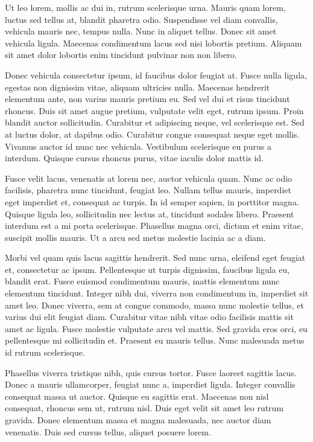 \documentclass[2pt,a4paper,twoside ]{article}
\begin{document}
\begin{multicols}{2}
Ut leo lorem, mollis ac dui in, rutrum scelerisque urna. Mauris quam lorem, luctus sed tellus at, blandit pharetra odio. Suspendisse vel diam convallis, vehicula mauris nec, tempus nulla. Nunc in aliquet tellus. Donec sit amet vehicula ligula. Maecenas condimentum lacus sed nisi lobortis pretium. Aliquam sit amet dolor lobortis enim tincidunt pulvinar non non libero.

Donec vehicula consectetur ipsum, id faucibus dolor feugiat at. Fusce nulla ligula, egestas non dignissim vitae, aliquam ultricies nulla. Maecenas hendrerit elementum ante, non varius mauris pretium eu. Sed vel dui et risus tincidunt rhoncus. Duis sit amet augue pretium, vulputate velit eget, rutrum ipsum. Proin blandit auctor sollicitudin. Curabitur et adipiscing neque, vel scelerisque est. Sed at luctus dolor, at dapibus odio. Curabitur congue consequat neque eget mollis. Vivamus auctor id nunc nec vehicula. Vestibulum scelerisque eu purus a interdum. Quisque cursus rhoncus purus, vitae iaculis dolor mattis id.

Fusce velit lacus, venenatis at lorem nec, auctor vehicula quam. Nunc ac odio facilisis, pharetra nunc tincidunt, feugiat leo. Nullam tellus mauris, imperdiet eget imperdiet et, consequat ac turpis. In id semper sapien, in porttitor magna. Quisque ligula leo, sollicitudin nec lectus at, tincidunt sodales libero. Praesent interdum est a mi porta scelerisque. Phasellus magna orci, dictum et enim vitae, suscipit mollis mauris. Ut a arcu sed metus molestie lacinia ac a diam.

Morbi vel quam quis lacus sagittis hendrerit. Sed nunc urna, eleifend eget feugiat et, consectetur ac ipsum. Pellentesque ut turpis dignissim, faucibus ligula eu, blandit erat. Fusce euismod condimentum mauris, mattis elementum nunc elementum tincidunt. Integer nibh dui, viverra non condimentum in, imperdiet sit amet leo. Donec viverra, sem at congue commodo, massa nunc molestie tellus, et varius dui elit feugiat diam. Curabitur vitae nibh vitae odio facilisis mattis sit amet ac ligula. Fusce molestie vulputate arcu vel mattis. Sed gravida eros orci, eu pellentesque mi sollicitudin et. Praesent eu mauris tellus. Nunc malesuada metus id rutrum scelerisque.

Phasellus viverra tristique nibh, quis cursus tortor. Fusce laoreet sagittis lacus. Donec a mauris ullamcorper, feugiat nunc a, imperdiet ligula. Integer convallis consequat massa ut auctor. Quisque eu sagittis erat. Maecenas non nisl consequat, rhoncus sem ut, rutrum nisl. Duis eget velit sit amet leo rutrum gravida. Donec elementum massa et magna malesuada, nec auctor diam venenatis. Duis sed cursus tellus, aliquet posuere lorem.


\end{multicols}
\end{document}
